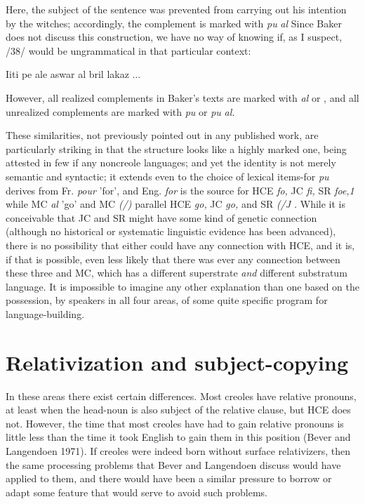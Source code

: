 Here, the subject of the sentence was prevented from carrying out his intention by the witches; accordingly, the complement is marked with \textit{pu} \textit{al} Since Baker does not discuss this construction, we have no way of knowing if, as I suspect, /38/ would be ungrammatical in that particular context:

\ea\label{ex:38}
 Iiti pe ale aswar al bril lakaz ... 
\z

However, all realized complements in Baker's texts are marked with \textit{al}
or {\zero} , and all unrealized complements are marked with \textit{pu} or \textit{pu} \textit{al.}

These similarities, not previously pointed out in any published work, are particularly striking in that the structure looks like a highly marked one, being attested in few if any noncreole languages; and yet the identity is not merely semantic and syntactic; it extends even to the choice of lexical items-for \textit{pu} derives from Fr. \textit{pour} 'for', and Eng. \textit{for}
is the source for HCE \textit{fo,} JC \textit{fi,} SR \textit{foe,1 }while MC \textit{al} 'go' and MC \textit{(/)}
parallel HCE \textit{go,} JC \textit{go,} and SR \textit{(/J} \textit{.} While it is conceivable that JC and SR might have some kind of genetic connection (although no historical or systematic linguistic evidence has been advanced), there is no possi\-bility that either could have any connection with HCE, and it is, if that is possible, even less likely that there was ever any connection between these three and MC, which has a different superstrate \textit{and} different substratum language. It is impossible to imagine any other
explanation than one based on the possession, by speakers in all four areas, of some quite specific program for language-building.

\section{Relativization and subject-copying}

In these areas there exist certain differences. Most creoles have relative pronouns, at least when the head-noun is also subject of the relative clause, but HCE does not. However, the time that most creoles have had to gain relative pronouns is little less than the time it took English to gain them in this position (Bever and Langendoen 1971). If creoles were indeed born without surface relativizers, then the same processing problems that Bever and Langendoen discuss would have applied to them, and there would have been a similar pressure to borrow or adapt some feature that would serve to avoid such problems.

